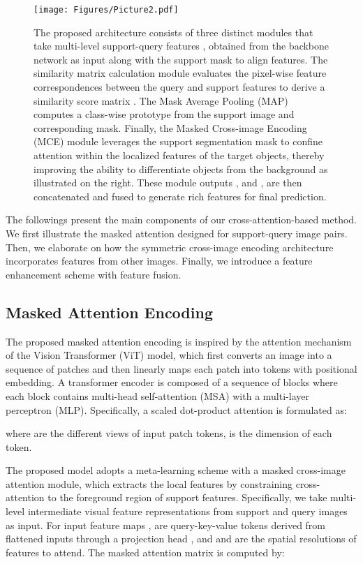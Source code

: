 \documentclass[conference]{IEEEtran}
\begin{document}
\begin{figure}[t]

               \centering
            \texttt{[image: Figures/Picture2.pdf]}
\caption{The proposed architecture consists of three distinct modules that take multi-level support-query features ,  obtained from the backbone network as input along with the support mask to align features. The similarity matrix calculation module evaluates the pixel-wise feature correspondences between the query and support features to derive a similarity score matrix . The Mask Average Pooling (MAP) computes a class-wise prototype  from the support image and corresponding mask. Finally, the Masked Cross-image Encoding (MCE) module leverages the support segmentation mask to confine attention within the localized features of the target objects, thereby improving the ability to differentiate objects from the background as illustrated on the right. These module outputs ,  and , are then concatenated and fused to generate rich features for final prediction.}
               \label{fig:fig2}

\end{figure}

The followings present the main components of our cross-attention-based method. We first illustrate the masked attention designed for support-query image pairs. Then, we elaborate on how the symmetric cross-image encoding architecture incorporates features from other images. Finally, we introduce a feature enhancement scheme with feature fusion.
\subsection{Masked Attention Encoding}
The proposed masked attention encoding is inspired by the attention mechanism of the Vision Transformer (ViT) \cite{ViT} model, which first converts an image into a sequence of patches and then linearly maps each patch into tokens with positional embedding. A transformer encoder is composed of a sequence of blocks where each block contains multi-head self-attention (MSA) with a multi-layer perceptron (MLP). Specifically, a scaled dot-product attention is formulated as:

where  are the different views of input patch tokens,  is the dimension of each token.

The proposed model adopts a meta-learning scheme with a masked cross-image attention module, which extracts the local features by constraining cross-attention to the foreground region of support features. Specifically, we take multi-level intermediate visual feature representations from support and query images as input. For input feature maps ,  are query-key-value tokens derived from flattened inputs through a projection head , and  and  are the spatial resolutions of features to attend. The masked attention matrix is computed by:
\end{document}
